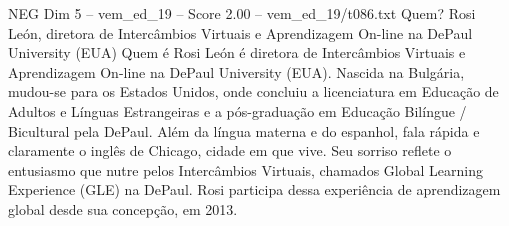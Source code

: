 \begin{textsample}{NEG Dim 5 – vem\_ed\_19 – Score 2.00 – vem\_ed\_19/t086.txt}  \label{ex:f5_neg_042}
Quem?
Rosi León, diretora de Intercâmbios Virtuais e Aprendizagem On-line na DePaul University (EUA) Quem é Rosi León é diretora de Intercâmbios Virtuais e Aprendizagem On-line na DePaul University (EUA).
Nascida na Bulgária, mudou-se para os Estados Unidos, onde concluiu a licenciatura em Educação de Adultos e Línguas Estrangeiras e a pós-graduação em Educação Bilíngue / Bicultural pela DePaul.
Além da língua materna e do espanhol, fala rápida e claramente o inglês de Chicago, cidade em que vive.
Seu sorriso reflete o entusiasmo que nutre pelos Intercâmbios Virtuais, chamados Global Learning Experience (GLE) na DePaul.
Rosi participa dessa experiência de aprendizagem global desde sua concepção, em 2013.

\end{textsample}

